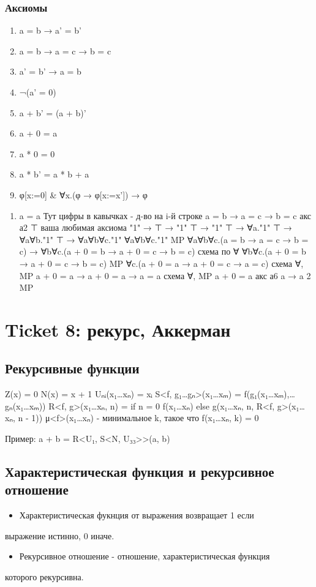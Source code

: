 \documentclass[11pt]{article}
\begin{document}
\subsubsection{Аксиомы}
\label{sec-9-3-1}
\begin{enumerate}
\item a = b → a' = b'
\item a = b → a = c → b = c
\item a' = b' → a = b
\item ¬(a' = 0)
\item a + b' = (a + b)'
\item a + 0 = a
\item a * 0 = 0
\item a * b' = a * b + a
\item φ[x:=0] \& ∀x.(φ → φ[x:=x']) → φ
\end{enumerate}
\begin{enumerate}
\item a = a
\label{sec-9-3-1-1}
Тут цифры в кавычках - д-во на i-й строке
a = b → a = c → b = c                акс а2
⊤                                    ваша любимая аксиома
"1" → ⊤ → "1"
⊤ → "1"
⊤ → ∀a."1"
⊤ → ∀a∀b."1"
⊤ → ∀a∀b∀c."1"
∀a∀b∀c."1"                           MP
∀a∀b∀c.(a = b → a = c → b = c) →
∀b∀c.(a + 0 = b → a + 0 = c → b = c) схема по ∀
∀b∀c.(a + 0 = b → a + 0 = c → b = c) MP
∀c.(a + 0 = a → a + 0 = c → a = c)   схема ∀, MP
a + 0 = a → a + 0 = a → a = a        схема ∀, MP
a + 0 = a                            акс а6
a → a                                2 MP
\end{enumerate}
\section{Ticket 8: рекурс, Аккерман}
\label{sec-10}
\subsection{Рекурсивные функции}
\label{sec-10-1}
Z(x) = 0
N(x) = x + 1
Uₙᵢ(x₁\ldots{}xₙ) = xᵢ
S<f, g₁\ldots{}gₙ>(x₁\ldots{}xₘ) = f(g₁(x₁\ldots{}xₘ),\ldots{}gₙ(x₁\ldots{}xₘ))
R<f, g>(x₁\ldots{}xₙ, n) = if n = 0
f(x₁\ldots{}xₙ)
else g(x₁\ldots{}xₙ, n, R<f, g>(x₁\ldots{}xₙ, n - 1))
μ<f>(x₁\ldots{}xₙ) - минимальное k, такое что f(x₁\ldots{}xₙ, k) = 0

Пример:
a + b = R<U₁, S<N, U₃₃>>(a, b)
\subsection{Характеристическая функция и рекурсивное отношение}
\label{sec-10-2}
\begin{itemize}
\item Характеристическая фукнция от выражения возвращает 1 если
\end{itemize}
выражение истинно, 0 иначе.
\begin{itemize}
\item Рекурсивное отношение - отношение, характеристическая функция
\end{itemize}
которого рекурсивна.
\end{document}
